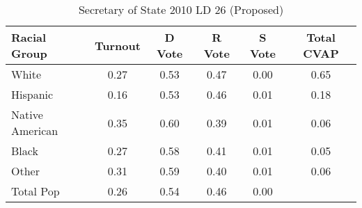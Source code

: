 \begin{table}[htb]
\begin{center}
\caption{Secretary of State 2010 LD 26 (Proposed)}
\label{sos10_cvap_ld_26}
\begin{tabular}{lccccc}
  \hline
Racial Group & Turnout & D Vote & R Vote & S Vote & Total CVAP \\ 
  \hline
White & 0.27 & 0.53 & 0.47 & 0.00 & 0.65 \\ 
  Hispanic & 0.16 & 0.53 & 0.46 & 0.01 & 0.18 \\ 
  Native American & 0.35 & 0.60 & 0.39 & 0.01 & 0.06 \\ 
  Black & 0.27 & 0.58 & 0.41 & 0.01 & 0.05 \\ 
  Other & 0.31 & 0.59 & 0.40 & 0.01 & 0.06 \\ 
  Total Pop & 0.26 & 0.54 & 0.46 & 0.00 &  \\ 
   \hline
\end{tabular}
\end{center}
\end{table}
